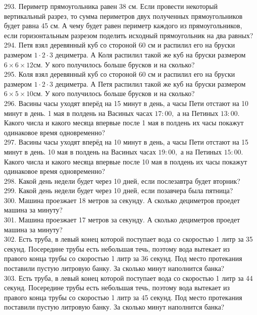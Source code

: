 293. Периметр прямоугольника равен 38 см. Если провести некоторый вертикальный разрез, то сумма периметров двух полученных прямоугольников будет равна 45 см. А чему будет равен периметр каждого из прямоугольников, если горизонтальным разрезом поделить исходный прямоугольник на два равных?\\
294. Петя взял деревянный куб со стороной 60 см и распилил его на бруски размером $1\cdot2\cdot3$ дециметра. А Коля распилил такой же куб на бруски размером $6\times6\times12$см. У кого получилось больше брусков и на сколько?\\
295. Коля взял деревянный куб со стороной 60 см и распилил его на бруски размером $1\cdot2\cdot3$ дециметра. А Петя распилил такой же куб на бруски размером $6\times5\times10$см. У кого получилось больше брусков и на сколько?\\
296. Васины часы уходят вперёд на 15 минут в день, а часы Пети отстают на 10 минут в день. 1 мая в полдень на Васиных часах $17:00,$ а на Петиных $13:00.$ Какого числа и какого месяца впервые после 1 мая в полдень их часы покажут одинаковое время одновременно?\\
297. Васины часы уходят вперёд на 10 минут в день, а часы Пети отстают на 15 минут в день. 10 мая в полдень на Васиных часах $19:00,$ а на Петиных $15:00.$ Какого числа и какого месяца впервые после 10 мая в полдень их часы покажут одинаковое время одновременно?\\
298. Какой день недели будет через 10 дней, если послезавтра будет вторник?\\
299. Какой день недели будет через 10 дней, если позавчера была пятница?\\
300. Машина проезжает 18 метров за секунду. А сколько дециметров проедет машина за минуту?\\
301. Машина проезжает 17 метров за секунду. А сколько дециметров проедет машина за минуту?\\
302. Есть труба, в левый конец которой поступает вода со скоростью 1 литр за 35 секунд. Посередине трубы есть небольшая течь, поэтому вода вытекает из правого конца трубы со скоростью 1 литр за 36 секунд. Под место протекания поставили пустую литровую банку. За сколько минут наполнится банка?\\
303. Есть труба, в левый конец которой поступает вода со скоростью 1 литр за 44 секунд. Посередине трубы есть небольшая течь, поэтому вода вытекает из правого конца трубы со скоростью 1 литр за 45 секунд. Под место протекания поставили пустую литровую банку. За сколько минут наполнится банка?\\
